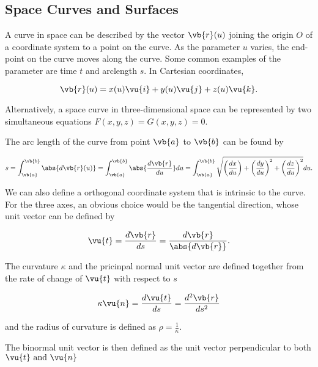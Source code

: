 \documentclass[english,a4paper,12pt]{report}
\begin{document}
\subsection{Space Curves and Surfaces}

A curve in space can be described by the vector \(\vb{r} (u)\) joining the origin \(O\) of a coordinate system to a point on the curve. As the parameter \(u\) varies, the end-point on the curve moves along the curve. Some common examples of the parameter are time \(t\) and arclength \(s\). In Cartesian coordinates, 

\begin{equation}
	\vb{r} (u) = x(u) \vu{i} + y(u) \vu{j} + z(u) \vu{k} .
\end{equation}

Alternatively, a space curve in three-dimensional space can be represented by two simultaneous equations \(F(x,y,z) = G(x,y,z) = 0\). 

The arc length of the curve from point \(\vb{a} \) to \(\vb{b} \) can be found by

\begin{equation}
	s = \int_{\vb{a} }^{\vb{b} } \abs{d \vb{r} (u)} = \int_{\vb{a} }^{\vb{b} } \abs{\frac{d\vb{r} }{du} } du = \int_{\vb{a} }^{\vb{b} } \sqrt{\left( \frac{dx}{du}\right) + \left( \frac{dy}{du}  \right)^2 + \left( \frac{dz}{du}  \right)^2} du.
\end{equation}

We can also define a orthogonal coordinate system that is intrinsic to the curve. For the three axes, an obvious choice would be the tangential direction, whose unit vector can be defined by

\begin{equation}
	\vu{t} = \frac{d\vb{r} }{ds} = \frac{d \vb{r} }{\abs{d \vb{r} } }.
\end{equation}

The curvature \(\kappa \) and the pricinpal normal unit vector are defined together from the rate of change of \(\vu{t} \) with respect to \(s\)

\begin{equation}
	\kappa \vu{n}  = \frac{d \vu{t} }{ds} = \frac{d^2\vb{r} }{ds^2}
\end{equation}

and the radius of curvature is defined as \(\displaystyle \rho = \frac{1}{\kappa } \). 

The binormal unit vector is then defined as the unit vector perpendicular to both \(\vu{t}  \text { and } \vu{n} \) 
\end{document}
